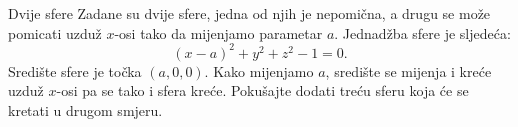 \begin{surferPage}{Dvije sfere}
Zadane su dvije sfere, jedna od njih je nepomi\v cna, a drugu se mo\v ze pomicati uzdu\v z $x$-osi tako da mijenjamo parametar $a$.
Jednad\v zba sfere je sljede\' ca:
\[(x-a)^2+y^2+z^2-1=0.\]
Sredi\v ste sfere je to\v cka $(a,0,0)$. Kako mijenjamo $a$, sredi\v ste se mijenja i kre\' ce uzdu\v z $x$-osi pa se tako i sfera kre\' ce.
Poku\v sajte dodati tre\' cu sferu koja \' ce se kretati u drugom smjeru.
\end{surferPage}
